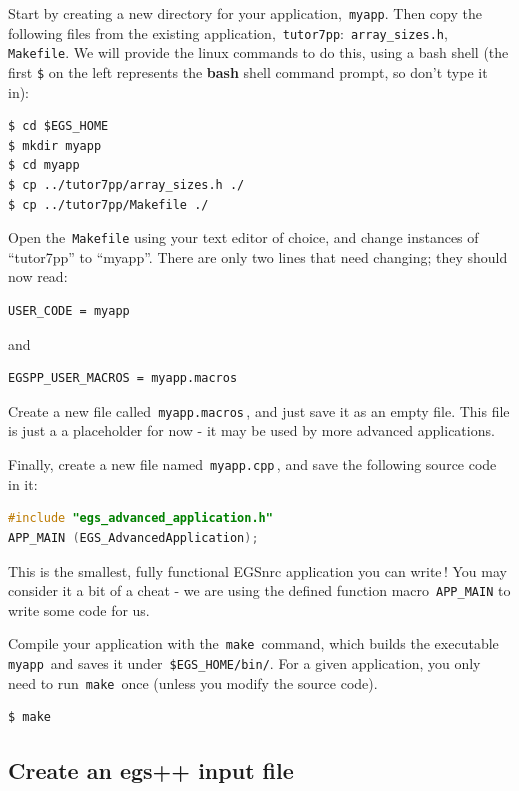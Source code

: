 \documentclass[12pt,twoside]{article}
\begin{document}
Start by creating a new directory for your application, \,\Verb|myapp|.
Then copy the following files from the existing application, \,\Verb|tutor7pp|: \,\Verb|array_sizes.h|, \,\Verb|Makefile|.
We will provide the linux commands to do this, using a bash shell
(the first \Verb|$| on the left represents the \textbf{bash} shell command prompt,
so don't type it in):

\begin{lstlisting}
$ cd $EGS_HOME
$ mkdir myapp
$ cd myapp
$ cp ../tutor7pp/array_sizes.h ./
$ cp ../tutor7pp/Makefile ./
\end{lstlisting}

Open the \,\Verb|Makefile| using your text editor of choice, and change
instances of ``tutor7pp'' to ``myapp''. There are only two lines that need
changing; they should now read:

\begin{lstlisting}
USER_CODE = myapp
\end{lstlisting}

and

\begin{lstlisting}
EGSPP_USER_MACROS = myapp.macros
\end{lstlisting}

Create a new file called \,\Verb|myapp.macros|\,, and just save it as an empty
file. This file is just a a placeholder for now - it may be used by
more advanced applications.

Finally, create a new file named \,\Verb|myapp.cpp|\,, and save the following
source code in it:

\begin{lstlisting}[language=c++,backgroundcolor=\color{white}]
#include "egs_advanced_application.h"
APP_MAIN (EGS_AdvancedApplication);
\end{lstlisting}

This is the smallest, fully functional EGSnrc application you can write\,!
You may consider it a bit of a cheat - we are using the defined function macro
\,\Verb|APP_MAIN| to write some code for us.

Compile your application with the \,\Verb|make|\, command, which builds the
executable \,\Verb|myapp|\, and saves it under \,\Verb|$EGS_HOME/bin/|. For a
given application, you only need to run \,\Verb|make|\, once
(unless you modify the source code).
\begin{lstlisting}
$ make
\end{lstlisting}

\subsection{Create an egs++ input file}
\end{document}
